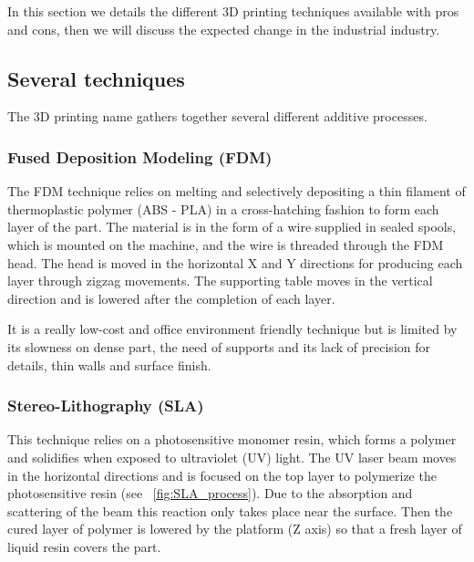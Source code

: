 In this section we details the different 3D printing techniques available with pros and cons, then we will discuss the expected change in the industrial industry.

\subsection{Several techniques} %

The 3D printing name gathers together several different additive processes.

\subsubsection{Fused Deposition Modeling (FDM)} %

The FDM technique relies on melting and selectively depositing a thin filament of thermoplastic polymer (ABS - PLA) in a cross-hatching fashion to form each layer of the part. The material is in the form of a wire supplied in sealed spools, which is mounted on the machine, and the wire is threaded through the FDM head. The head is moved in the horizontal X and Y directions for producing each layer through zigzag movements. The supporting table moves in the vertical direction and is lowered after the completion of each layer.

\begin{figure}[h]
    \centering
        \hfil
        \hfil
    \caption{}
    \label{fig:FDM_technique}
\end{figure}

It is a really low-cost and office environment friendly technique but is limited by its slowness on dense part, the need of supports and its lack of precision for details, thin walls and surface finish.


\subsubsection{Stereo-Lithography (SLA)} %

This technique relies on a photosensitive monomer resin, which forms a polymer and solidifies when exposed to ultraviolet (UV) light. The UV laser beam moves in the horizontal directions and is focused on the top layer to polymerize the photosensitive resin (see \figurename~\ref{fig:SLA_process}). Due to the absorption and scattering of the beam this reaction only takes place near the surface. Then the cured layer of polymer is lowered by the platform (Z axis) so that a fresh layer of liquid resin covers the part.

